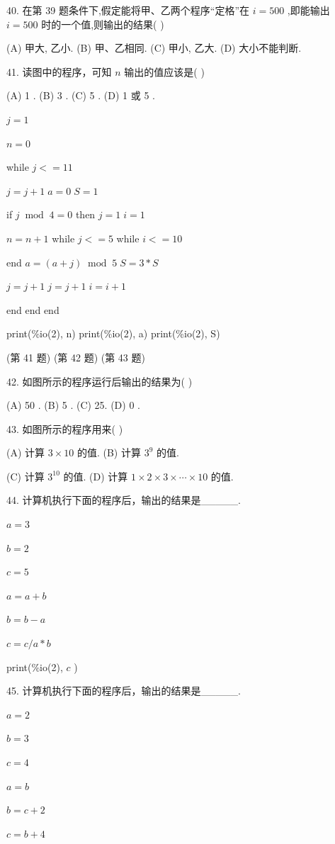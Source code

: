 \documentclass[10pt]{article}
\begin{document}
40. 在第 39 题条件下,假定能将甲、乙两个程序“定格”在 \(i = {500}\) ,即能输出 \(i = {500}\) 时的一个值,则输出的结果( )

(A) 甲大, 乙小. (B) 甲、乙相同. (C) 甲小, 乙大. (D) 大小不能判断.

41. 读图中的程序，可知 \(n\) 输出的值应该是( )

(A) 1 . (B) 3 . (C) 5 . (D) 1 或 5 .

\(j = 1\)

\(n = 0\)

while \(j <  = {11}\)

\(j = j + 1 \; a = 0 \; S = 1\)

if \(j{\;\operatorname{mod}\;4} = 0\) then \(j = 1 \; i = 1\)

\(n = n + 1\) while \(j <  = 5\) while \(i <  = {10}\)

end \(a = \left( {a + j}\right) {\;\operatorname{mod}\;5} \; S = 3 * S\)

\(j = j + 1 \; j = j + 1 \; i = i + 1\)

end end end

print(\%io(2), n) print(\%io(2), a) print(\%io(2), S)

(第 41 题) (第 42 题) (第 43 题)

42. 如图所示的程序运行后输出的结果为( )

(A) 50 . (B) 5 . (C) 25. (D) 0 .

43. 如图所示的程序用来( )

(A) 计算 \(3 \times  {10}\) 的值. (B) 计算 \({3}^{9}\) 的值.

(C) 计算 \({3}^{10}\) 的值. (D) 计算 \(1 \times  2 \times  3 \times  \cdots  \times  {10}\) 的值.

44. 计算机执行下面的程序后，输出的结果是\_\_\_\_\_.

\(a = 3\)

\(b = 2\)

\(c = 5\)

\(a = a + b\)

\(b = b - a\)

\(c = c/a * b\)

print(\%io(2), \(c\) )

45. 计算机执行下面的程序后，输出的结果是\_\_\_\_\_.

\(a = 2\)

\(b = 3\)

\(c = 4\)

\(a = b\)

\(b = c + 2\)

\(c = b + 4\)
\end{document}
